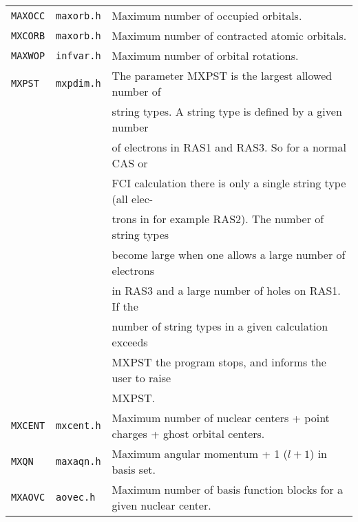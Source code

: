 \bigskip

\begin{tabular}{lll}
\verb|MAXOCC| & \verb|maxorb.h| & Maximum number of occupied
orbitals.\index{occupied orbitals!max limit}\index{limits}\\
\verb|MXCORB| & \verb|maxorb.h| & Maximum number of contracted atomic
orbitals.\index{orbitals!max limit}\index{limits!orbitals}\\
\verb|MAXWOP| & \verb|infvar.h| & Maximum number of orbital
rotations.\index{orbital rotations!max limit}\index{limits}\\
\verb|MXPST| & \verb|mxpdim.h| & The parameter MXPST is the largest
allowed number\index{limits!CI string types} of \\
&& string types.  A string type is defined by a given number \\
&& of electrons in RAS1 and RAS3. So for a normal CAS or \\
&& FCI calculation there is only a single string type (all elec-\\
&&trons in for example RAS2). The number of string types \\
&& become large when one allows a large number of electrons \\
&& in  RAS3  and a large number of holes on RAS1. If the \\
&& number of  string types in a given calculation exceeds \\
&& MXPST the program stops, and informs the user to raise\\
&& MXPST.\\
\verb|MXCENT| & \verb|mxcent.h| & Maximum number of nuclear centers +
point charges + ghost orbital centers.\index{nuclei!change max number}\index{limits!number of nuclei}\\
\verb|MXQN| & \verb|maxaqn.h| & Maximum angular momentum + 1 ($l+1$) in basis
set.\index{limits!max l-quantum number in basis functions}\\
\verb|MXAOVC| & \verb|aovec.h| & Maximum number of basis function blocks for
a given nuclear center.\index{limits!number of basis function blocks}
\end{tabular}


